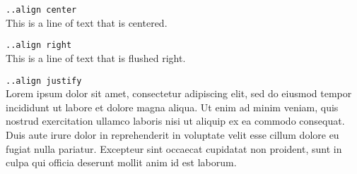 \documentclass[12pt]{article}
\begin{document}
\begin{center}
\verb|..align center|\\
This is a line of text that is centered.

\end{center}

\begin{flushright}
\verb|..align right|\\
This is a line of text that is flushed right.

\end{flushright}
\verb|..align justify|\\
Lorem ipsum dolor sit amet, consectetur adipiscing elit, sed do eiusmod tempor incididunt ut labore et dolore magna aliqua. Ut enim ad minim veniam, quis nostrud exercitation ullamco laboris nisi ut aliquip ex ea commodo consequat. Duis aute irure dolor in reprehenderit in voluptate velit esse cillum dolore eu fugiat nulla pariatur. Excepteur sint occaecat cupidatat non proident, sunt in culpa qui officia deserunt mollit anim id est laborum.

\medskip
\end{document}
